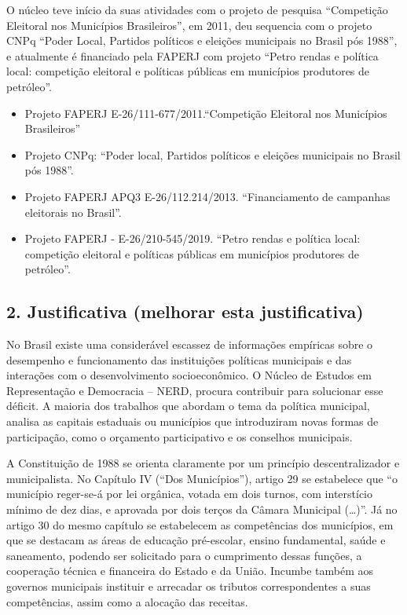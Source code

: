 \documentclass[
  12pt,
]{article}
\providecommand{\tightlist}{%
  \setlength{\itemsep}{0pt}\setlength{\parskip}{0pt}}
\begin{document}
O núcleo teve início da suas atividades com o projeto de pesquisa
``Competição Eleitoral nos Municípios Brasileiros'', em 2011, deu
sequencia com o projeto CNPq ``Poder Local, Partidos políticos e
eleições municipais no Brasil pós 1988'', e atualmente é financiado pela
FAPERJ com projeto ``Petro rendas e política local: competição eleitoral
e políticas públicas em municípios produtores de petróleo''.

\begin{itemize}
\tightlist
\item
  Projeto FAPERJ E-26/111-677/2011.``Competição Eleitoral nos Municípios
  Brasileiros''
\item
  Projeto CNPq: ``Poder local, Partidos políticos e eleições municipais
  no Brasil pós 1988''.
\item
  Projeto FAPERJ APQ3 E-26/112.214/2013. ``Financiamento de campanhas
  eleitorais no Brasil''.
\item
  Projeto FAPERJ - E-26/210-545/2019. ``Petro rendas e política local:
  competição eleitoral e políticas públicas em municípios produtores de
  petróleo''.
\end{itemize}

\hypertarget{justificativa-melhorar-esta-justificativa}{%
\subsection{2. Justificativa (melhorar esta
justificativa)}\label{justificativa-melhorar-esta-justificativa}}

\hfill\break  No Brasil existe uma considerável escassez de informações
empíricas sobre o desempenho e funcionamento das instituições políticas
municipais e das interações com o desenvolvimento socioeconômico. O
Núcleo de Estudos em Representação e Democracia -- NERD, procura
contribuir para solucionar esse déficit. A maioria dos trabalhos que
abordam o tema da política municipal, analisa as capitais estaduais ou
municípios que introduziram novas formas de participação, como o
orçamento participativo e os conselhos municipais.

A Constituição de 1988 se orienta claramente por um princípio
descentralizador e municipalista. No Capítulo IV (``Dos Municípios''),
artigo 29 se estabelece que ``o município reger-se-á por lei orgânica,
votada em dois turnos, com interstício mínimo de dez dias, e aprovada
por dois terços da Câmara Municipal (\ldots)''. Já no artigo 30 do mesmo
capítulo se estabelecem as competências dos municípios, em que se
destacam as áreas de educação pré-escolar, ensino fundamental, saúde e
saneamento, podendo ser solicitado para o cumprimento dessas funções, a
cooperação técnica e financeira do Estado e da União. Incumbe também aos
governos municipais instituir e arrecadar os tributos correspondentes a
suas competências, assim como a alocação das receitas.
\end{document}
